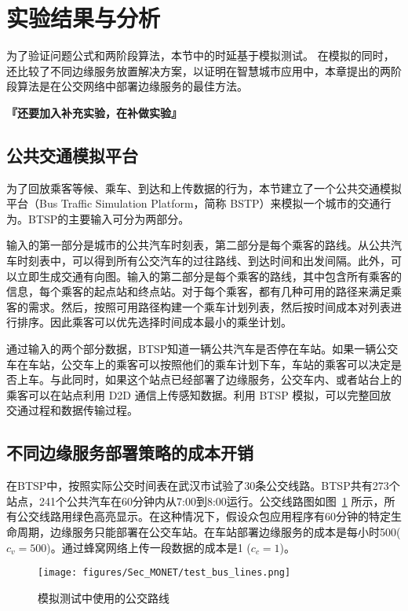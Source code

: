\section{实验结果与分析}

为了验证问题公式和两阶段算法，本节中的时延基于模拟测试。
在模拟的同时，还比较了不同边缘服务放置解决方案，以证明在智慧城市应用中，本章提出的两阶段算法是在公交网络中部署边缘服务的最佳方法。

\textbf{『还要加入补充实验，在补做实验』}

\subsection{公共交通模拟平台}


为了回放乘客等候、乘车、到达和上传数据的行为，本节建立了一个公共交通模拟平台（Bus Traffic Simulation Platform，简称 BSTP）来模拟一个城市的交通行为。BTSP的主要输入可分为两部分。

输入的第一部分是城市的公共汽车时刻表，第二部分是每个乘客的路线。从公共汽车时刻表中，可以得到所有公交汽车的过往路线、到达时间和出发间隔。此外，可以立即生成交通有向图。输入的第二部分是每个乘客的路线，其中包含所有乘客的信息，每个乘客的起点站和终点站。对于每个乘客，都有几种可用的路径来满足乘客的需求。然后，按照可用路径构建一个乘车计划列表，然后按时间成本对列表进行排序。因此乘客可以优先选择时间成本最小的乘坐计划。

通过输入的两个部分数据，BTSP知道一辆公共汽车是否停在车站。如果一辆公交车在车站，公交车上的乘客可以按照他们的乘车计划下车，车站的乘客可以决定是否上车。与此同时，如果这个站点已经部署了边缘服务，公交车内、或者站台上的乘客可以在站点利用 D2D 通信上传感知数据。利用 BTSP 模拟，可以完整回放交通过程和数据传输过程。

\subsection{不同边缘服务部署策略的成本开销}

在BTSP中，按照实际公交时间表在武汉市试验了30条公交线路。BTSP共有273个站点，241个公共汽车在60分钟内从7:00到8:00运行。公交线路图如图~\ref{Figure_test_bus_lines} 所示，所有公交线路用绿色高亮显示。在这种情况下，假设众包应用程序有60分钟的特定生命周期，边缘服务只能部署在公交车站。在车站部署边缘服务的成本是每小时500($c_v = 500$)。通过蜂窝网络上传一段数据的成本是1 ($c_c = 1$)。

\begin{figure}[!h]
  \centering
  \texttt{[image: figures/Sec\_MONET/test\_bus\_lines.png]}
  \vspace{-0.5em}
  \caption{模拟测试中使用的公交路线}
  \label{Figure_test_bus_lines}
\end{figure}


